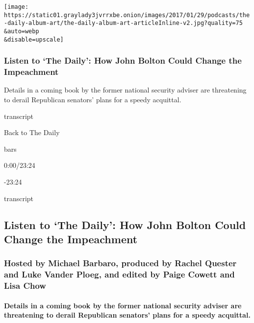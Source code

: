 \texttt{[image: https://static01.graylady3jvrrxbe.onion/images/2017/01/29/podcasts/the-daily-album-art/the-daily-album-art-articleInline-v2.jpg?quality=75\\\&auto=webp\\\&disable=upscale]}

\hypertarget{listen-to-the-daily-how-john-bolton-could-change-the-impeachment}{%
\subsubsection{Listen to `The Daily': How John Bolton Could Change the
Impeachment}\label{listen-to-the-daily-how-john-bolton-could-change-the-impeachment}}

Details in a coming book by the former national security adviser are
threatening to derail Republican senators' plans for a speedy acquittal.

transcript

Back to The Daily

bars

0:00/23:24

-23:24

transcript

\hypertarget{listen-to-the-daily-how-john-bolton-could-change-the-impeachment-1}{%
\subsection{Listen to `The Daily': How John Bolton Could Change the
Impeachment}\label{listen-to-the-daily-how-john-bolton-could-change-the-impeachment-1}}

\hypertarget{hosted-by-michael-barbaro-produced-by-rachel-quester-and-luke-vander-ploeg-and-edited-by-paige-cowett-and-lisa-chow}{%
\subsubsection{Hosted by Michael Barbaro, produced by Rachel Quester and
Luke Vander Ploeg, and edited by Paige Cowett and Lisa
Chow}\label{hosted-by-michael-barbaro-produced-by-rachel-quester-and-luke-vander-ploeg-and-edited-by-paige-cowett-and-lisa-chow}}

\hypertarget{details-in-a-coming-book-by-the-former-national-security-adviser-are-threatening-to-derail-republican-senators-plans-for-a-speedy-acquittal}{%
\paragraph{Details in a coming book by the former national security
adviser are threatening to derail Republican senators' plans for a
speedy
acquittal.}\label{details-in-a-coming-book-by-the-former-national-security-adviser-are-threatening-to-derail-republican-senators-plans-for-a-speedy-acquittal}}

